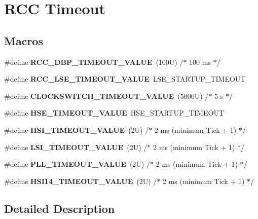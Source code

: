 \hypertarget{group___r_c_c___timeout}{}\section{R\+CC Timeout}
\label{group___r_c_c___timeout}
\subsection*{Macros}
\begin{DoxyCompactItemize}
\item 
\mbox{\label{group___r_c_c___timeout_gae578b5efd6bd38193ab426ce65cb77b1}} 
\#define {\bfseries R\+C\+C\+\_\+\+D\+B\+P\+\_\+\+T\+I\+M\+E\+O\+U\+T\+\_\+\+V\+A\+L\+UE}~(100\+U)       /$\ast$ 100 ms $\ast$/
\item 
\mbox{\label{group___r_c_c___timeout_gafe8ed1c0ca0e1c17ea69e09391498cc7}} 
\#define {\bfseries R\+C\+C\+\_\+\+L\+S\+E\+\_\+\+T\+I\+M\+E\+O\+U\+T\+\_\+\+V\+A\+L\+UE}~L\+S\+E\+\_\+\+S\+T\+A\+R\+T\+U\+P\+\_\+\+T\+I\+M\+E\+O\+UT
\item 
\mbox{\label{group___r_c_c___timeout_gab3caadc0f23d394d1033aba55d31fcdc}} 
\#define {\bfseries C\+L\+O\+C\+K\+S\+W\+I\+T\+C\+H\+\_\+\+T\+I\+M\+E\+O\+U\+T\+\_\+\+V\+A\+L\+UE}~(5000\+U)  /$\ast$ 5 s    $\ast$/
\item 
\mbox{\label{group___r_c_c___timeout_gac0cd4ed24fa948844e1a40b12c450f32}} 
\#define {\bfseries H\+S\+E\+\_\+\+T\+I\+M\+E\+O\+U\+T\+\_\+\+V\+A\+L\+UE}~H\+S\+E\+\_\+\+S\+T\+A\+R\+T\+U\+P\+\_\+\+T\+I\+M\+E\+O\+UT
\item 
\mbox{\label{group___r_c_c___timeout_gad9e56670dcbbe9dbc3a8971b36bbec58}} 
\#define {\bfseries H\+S\+I\+\_\+\+T\+I\+M\+E\+O\+U\+T\+\_\+\+V\+A\+L\+UE}~(2\+U)      /$\ast$ 2 ms (minimum Tick + 1) $\ast$/
\item 
\mbox{\label{group___r_c_c___timeout_gad52c7f624c88b0c82ab41b9dbd2b347f}} 
\#define {\bfseries L\+S\+I\+\_\+\+T\+I\+M\+E\+O\+U\+T\+\_\+\+V\+A\+L\+UE}~(2\+U)      /$\ast$ 2 ms (minimum Tick + 1) $\ast$/
\item 
\mbox{\label{group___r_c_c___timeout_gad54d8ad9b3511329efee38b3ad0665de}} 
\#define {\bfseries P\+L\+L\+\_\+\+T\+I\+M\+E\+O\+U\+T\+\_\+\+V\+A\+L\+UE}~(2\+U)      /$\ast$ 2 ms (minimum Tick + 1) $\ast$/
\item 
\mbox{\label{group___r_c_c___timeout_ga0b8322aa066fcb16ec98dff7f37bb706}} 
\#define {\bfseries H\+S\+I14\+\_\+\+T\+I\+M\+E\+O\+U\+T\+\_\+\+V\+A\+L\+UE}~(2\+U)      /$\ast$ 2 ms (minimum Tick + 1) $\ast$/
\end{DoxyCompactItemize}


\subsection{Detailed Description}
